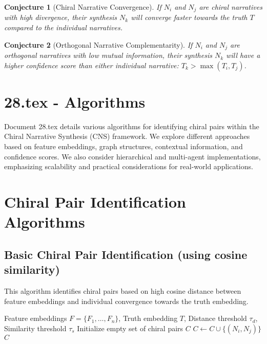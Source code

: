 \documentclass[12pt, a4paper]{article}
\newtheorem{conjecture}{Conjecture}
\begin{document}
\begin{conjecture}[Chiral Narrative Convergence]
If $N_i$ and $N_j$ are chiral narratives with high divergence, their synthesis $N_k$ will converge faster towards the truth $T$ compared to the individual narratives.
\end{conjecture}

\begin{conjecture}[Orthogonal Narrative Complementarity]
If $N_i$ and $N_j$ are orthogonal narratives with low mutual information, their synthesis $N_k$ will have a higher confidence score than either individual narrative: $T_k > \max(T_i, T_j)$.
\end{conjecture}











\section{28.tex - Algorithms}
Document 28.tex details various algorithms for identifying chiral pairs within the Chiral Narrative Synthesis (CNS) framework. We explore different approaches based on feature embeddings, graph structures, contextual information, and confidence scores.  We also consider hierarchical and multi-agent implementations, emphasizing scalability and practical considerations for real-world applications.

\section{Chiral Pair Identification Algorithms}

\subsection{Basic Chiral Pair Identification (using cosine similarity)}

This algorithm identifies chiral pairs based on high cosine distance between feature embeddings and individual convergence towards the truth embedding.

\begin{algorithm}[H]
\caption{Basic Chiral Pair Identification}
\begin{algorithmic}[1]
\Require Feature embeddings $F = \{F_1, \dots, F_n\}$, Truth embedding $T$, Distance threshold $\tau_d$, Similarity threshold $\tau_s$
\State Initialize empty set of chiral pairs $C$
        \State $C \gets C \cup \{(N_i, N_j)\}$
    \EndIf
\EndFor
\Return $C$
\end{algorithmic}
\end{algorithm}
\end{document}
